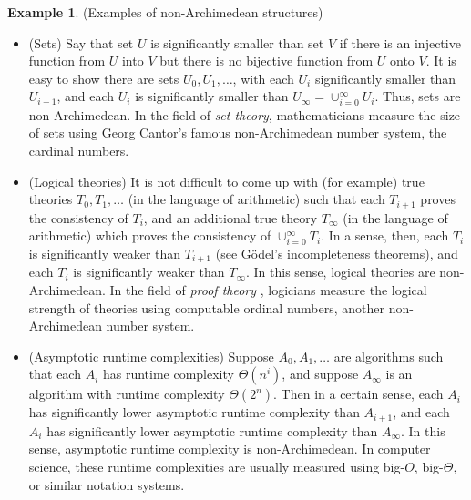 \documentclass[reqno]{article}
\theoremstyle{definition}
\newtheorem{example}[theorem]{Example}
\begin{document}
\begin{example}
\label{nonexamples}
(Examples of non-Archimedean structures)
    \begin{itemize}
        \item
        (Sets)
        Say that set $U$ is significantly smaller than set $V$ if there is an injective
        function from $U$ into $V$ but there is no bijective function from $U$
        onto $V$. It is easy to show there are sets $U_0,U_1,\ldots$, with each
        $U_{i}$ significantly smaller than $U_{i+1}$, and each $U_i$ is
        significantly smaller than
        $U_\infty=\cup_{i=0}^\infty U_i$.
        Thus, sets are
        non-Archimedean. In the field of \emph{set theory}, mathematicians measure
        the size of sets using Georg Cantor's famous non-Archimedean number system,
        the cardinal numbers.
        \item
        (Logical theories)
        It is not difficult to come up with (for example) true
        theories $T_0,T_1,\ldots$ (in the language of arithmetic) such that
        each $T_{i+1}$ proves the consistency of $T_i$, and an additional
        true theory $T_\infty$ (in the language of arithmetic)
        which proves the consistency of $\cup_{i=0}^\infty T_i$.
        In a sense, then, each $T_i$ is significantly weaker than $T_{i+1}$
        (see G\"odel's incompleteness theorems), and each $T_i$ is
        significantly weaker than $T_\infty$. In this sense, logical theories
        are non-Archimedean. In the field
        of \emph{proof theory} \cite{pohlers2008proof} \cite{rathjen},
        logicians measure the logical strength of theories using computable
        ordinal numbers, another non-Archimedean number system.
        \item
        (Asymptotic runtime complexities)
        Suppose $A_0,A_1,\ldots$ are algorithms such that each $A_i$ has
        runtime complexity $\Theta(n^i)$, and suppose $A_\infty$ is an algorithm
        with runtime complexity $\Theta(2^n)$. Then in a certain sense, each
        $A_{i}$ has significantly lower asymptotic runtime complexity than $A_{i+1}$,
        and each $A_i$ has significantly lower asymptotic runtime complexity than
        $A_\infty$. In this sense, asymptotic runtime complexity is non-Archimedean.
        In computer science, these runtime complexities are usually measured using
        big-$O$, big-$\Theta$, or similar notation systems.
    \end{itemize}
\end{example}
\end{document}

